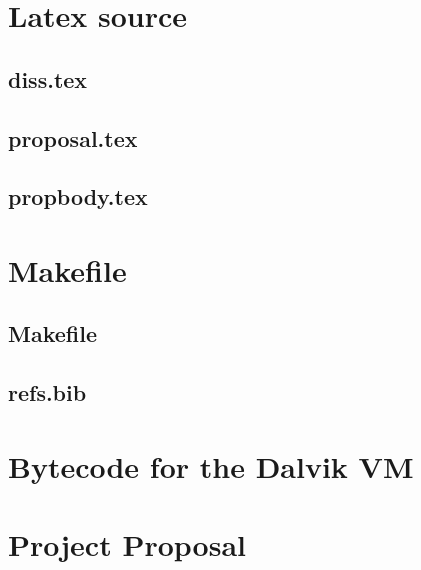 \documentclass[12pt,twoside,notitlepage]{report}
\begin{document}
\chapter{Latex source}

\section{diss.tex}
{\scriptsize}

\section{proposal.tex}
{\scriptsize}

\section{propbody.tex}
{\scriptsize}



\cleardoublepage

\chapter{Makefile}

\section{\label{makefile}Makefile}
{\scriptsize}

\section{refs.bib}
{\scriptsize}


\cleardoublepage

\chapter{Bytecode for the Dalvik VM}

% 


\cleardoublepage

\chapter{Project Proposal}


\end{document}
